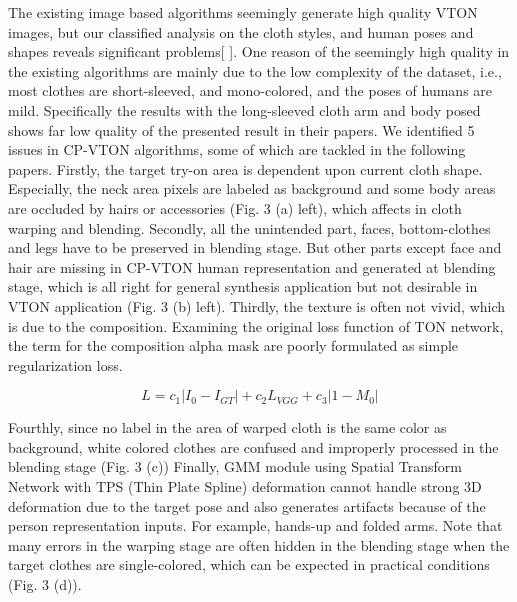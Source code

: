 \documentclass[runningheads]{llncs}
\begin{document}
The existing image based algorithms seemingly generate high quality VTON images, but our classified analysis on the cloth styles, and human poses and shapes reveals significant problems[  ]. One reason of the seemingly high quality in the existing algorithms are mainly due to the low complexity of the dataset, i.e., most clothes are short-sleeved, and mono-colored, and the poses of humans are mild. Specifically the results with the long-sleeved cloth arm and body posed shows far low quality of the presented result in their papers. We identified 5 issues in CP-VTON\cite{Wang2018TowardCI} algorithms, some of which are tackled in the following papers. Firstly, the target try-on area is dependent upon current cloth shape. Especially, the neck area pixels are labeled as background and some body areas are occluded by hairs or accessories (Fig. 3 (a) left), which affects in cloth warping and blending. Secondly, all the unintended part, faces, bottom-clothes and legs have to be preserved in blending stage. But other parts except face and hair are missing in CP-VTON\cite{Wang2018TowardCI} human representation and generated at blending stage, which is all right for general synthesis application but not desirable in VTON application (Fig. 3 (b) left). Thirdly, the texture is often not vivid, which is due to the composition. Examining the original loss function of TON network, the term for the composition alpha mask are poorly formulated as simple regularization loss.   

\begin{equation}
L = c_1 | I_0-I_{GT} |+  c_2 L_{VGG}+c_3 |1-M_0 |        
\end{equation} 

Fourthly, since no label in the area of warped cloth is the same color as background, white colored clothes are confused and improperly processed in the blending stage (Fig. 3 (c))
Finally, GMM module using Spatial Transform Network\cite{JaderbergSZK15} with TPS (Thin Plate Spline)\cite{Bookstein1989PrincipalWT} deformation cannot handle strong 3D deformation due to the target pose and also generates artifacts because of the person representation inputs. For example, hands-up and folded arms.  Note that many errors in the warping stage are often hidden in the blending stage when the target clothes are single-colored, which can be expected in practical conditions (Fig. 3 (d)).
\end{document}
